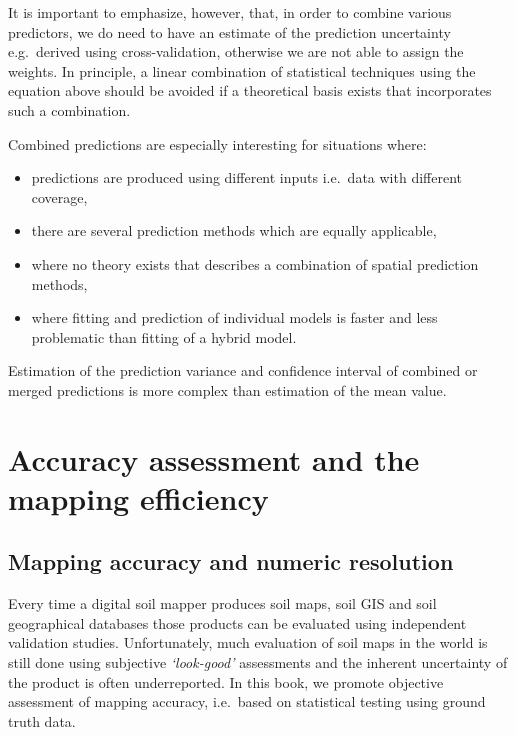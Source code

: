 \documentclass[graybox,natbib,nospthms,UStrade]{svmono}
\begin{document}
It is important to emphasize, however, that, in order to combine various
predictors, we do need to have an estimate of the prediction uncertainty
e.g.~derived using cross-validation, otherwise we are not able to assign
the weights. In principle, a linear combination of statistical techniques
using the equation above should be avoided if a theoretical basis exists
that incorporates such a combination.

Combined predictions are especially interesting for situations where:

\begin{itemize}
\item
  predictions are produced using different inputs i.e.~data with
  different coverage,
\item
  there are several prediction methods which are equally applicable,
\item
  where no theory exists that describes a combination of spatial
  prediction methods,
\item
  where fitting and prediction of individual models is faster and less
  problematic than fitting of a hybrid model.
\end{itemize}

Estimation of the prediction variance and confidence interval of
combined or merged predictions is more complex than estimation of the
mean value.

\hypertarget{accuracy-assessment}{%
\section{Accuracy assessment and the mapping efficiency}\label{accuracy-assessment}}

\hypertarget{mapping-accuracy}{%
\subsection{Mapping accuracy and numeric resolution}\label{mapping-accuracy}}

Every time a digital soil mapper produces soil maps, soil GIS and soil
geographical databases those products can be evaluated using independent
validation studies. Unfortunately, much evaluation of soil maps in the
world is still done using subjective \emph{`look-good'} assessments and the
inherent uncertainty of the product is often underreported. In this book,
we promote objective assessment of mapping accuracy, i.e.~based on
statistical testing using ground truth data.
\end{document}
